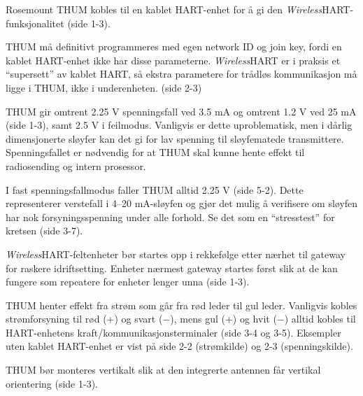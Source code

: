












Rosemount THUM kobles til en kablet HART-enhet for å gi den {\sl Wireless}HART-funksjonalitet (side 1-3).

\vskip 10pt

THUM må definitivt programmeres med egen network ID og join key, fordi en kablet HART-enhet ikke har disse parameterne. {\sl Wireless}HART er i praksis et ``supersett'' av kablet HART, så ekstra parametere for trådløs kommunikasjon må ligge i THUM, ikke i underenheten. (side 2-3)

\vskip 10pt

THUM gir omtrent 2.25 V spenningsfall ved 3.5 mA og omtrent 1.2 V ved 25 mA (side 1-3), samt 2.5 V i feilmodus. Vanligvis er dette uproblematisk, men i dårlig dimensjonerte sløyfer kan det gi for lav spenning til sløyfematede transmittere. Spenningsfallet er nødvendig for at THUM skal kunne hente effekt til radiosending og intern prosessor.

\vskip 10pt

I fast spenningsfallmodus faller THUM alltid 2.25 V (side 5-2). Dette representerer verstefall i 4--20 mA-sløyfen og gjør det mulig å verifisere om sløyfen har nok forsyningsspenning under alle forhold. Se det som en ``stresstest'' for kretsen (side 3-7).

\vskip 10pt

{\it Wireless}HART-feltenheter bør startes opp i rekkefølge etter nærhet til gateway for raskere idriftsetting. Enheter nærmest gateway startes først slik at de kan fungere som repeatere for enheter lenger unna (side 1-3).

\vskip 10pt

THUM henter effekt fra strøm som går fra rød leder til gul leder. Vanligvis kobles strømforsyning til rød (+) og svart ($-$), mens gul (+) og hvit ($-$) alltid kobles til HART-enhetens kraft/kommunikasjonsterminaler (side 3-4 og 3-5). Eksempler uten kablet HART-enhet er vist på side 2-2 (strømkilde) og 2-3 (spenningskilde).

\vskip 10pt

THUM bør monteres vertikalt slik at den integrerte antennen får vertikal orientering (side 1-3).



